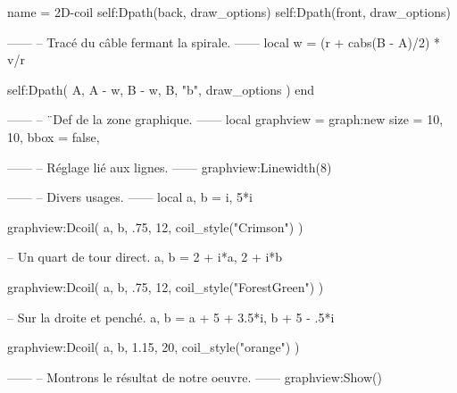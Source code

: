 \documentclass[varwidth]{standalone}
\begin{document}
\begin{luadraw*}{name = 2D-coil}
  self:Dpath(back, draw_options)
  self:Dpath(front, draw_options)

------
-- Tracé du câble fermant la spirale.
------
  local w = (r + cabs(B - A)/2) * v/r

  self:Dpath(
    {A, A - w, B - w, B, "b"},
    draw_options
  )
end

------
-- ¨Def de la zone graphique.
------
local graphview = graph:new{
  size = {10, 10},
  bbox = false,
}

------
-- Réglage lié aux lignes.
------
graphview:Linewidth(8)

------
-- Divers usages.
------
local a, b = i, 5*i

graphview:Dcoil(
  a, b,
  .75,
  12,
  coil_style("Crimson")
)

-- Un quart de tour direct.
a, b = 2 + i*a, 2 + i*b

graphview:Dcoil(
  a, b,
  .75,
  12,
  coil_style("ForestGreen")
)

-- Sur la droite et penché.
a, b = a + 5 + 3.5*i, b + 5 - .5*i

graphview:Dcoil(
  a, b,
  1.15,
  20,
  coil_style("orange")
)

------
-- Montrons le résultat de notre oeuvre.
------
graphview:Show()
\end{luadraw*}
\end{document}

